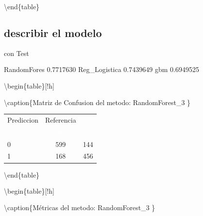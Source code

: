 \documentclass[]{article}
\begin{document}
\textbackslash{}end\{table\}

\hypertarget{describir-el-modelo-8}{%
\subsection{describir el modelo}\label{describir-el-modelo-8}}

con Test

RandomFores 0.7717630 Reg\_Logistica 0.7439649 gbm 0.6949525

\textbackslash{}begin\{table\}{[}!h{]}

\textbackslash{}caption\{\label{tab:MatrizConf_RandomForest_3}Matriz de
Confusion del metodo: RandomForest\_3 \} \centering

\begin{tabular}[t]{lcc}
\toprule
\multicolumn{1}{c}{Prediccion} & \multicolumn{1}{c}{Referencia} & \multicolumn{1}{c}{ } \\
\cmidrule(l{3pt}r{3pt}){1-1} \cmidrule(l{3pt}r{3pt}){2-2}
\rowcolor{black}  \multicolumn{1}{c}{\textcolor{white}{\textbf{ }}} & \multicolumn{1}{c}{\textcolor{white}{\textbf{0}}} & \multicolumn{1}{c}{\textcolor{white}{\textbf{1}}}\\
\midrule
\rowcolor{gray!6}  0 & 599 & 144\\
1 & 168 & 456\\
\bottomrule
\end{tabular}

\textbackslash{}end\{table\}

\textbackslash{}begin\{table\}{[}!h{]}

\textbackslash{}caption\{\label{tab:metricas_RandomForest_3}Métricas del
metodo: RandomForest\_3 \} \centering
\end{document}
